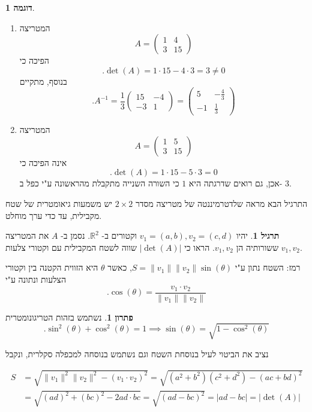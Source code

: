 \documentclass[12pt]{report}
\theoremstyle{plain}
\theoremstyle{definition}
\newtheorem{example}{דוגמה}[chapter]
\newtheorem{exercise}{תרגיל}[chapter]
\newtheorem*{solution}{פתרון}
\newcommand{\R}{\mathbb{R}}
\newcommand{\0}{\mathbf{0}}
\begin{document}
\begin{example}\
\begin{enumerate}[label=\alph*.]
\item 
המטריצה
$$
A=\begin{pmatrix}
1 & 4 \\
3 & 15
\end{pmatrix}
$$
הפיכה כי
$$
.\det(A)=1\cdot15-4\cdot3=3\neq 0
$$
בנוסף, מתקיים
$$
.A^{-1}=\frac{1}{3}\begin{pmatrix}
15 & -4 \\
-3 & 1
\end{pmatrix}=\begin{pmatrix}
5 & -\frac{4}{3} \\
-1 & \frac{1}{3}
\end{pmatrix}
$$

\item 
המטריצה
$$
A=\begin{pmatrix}
1 & 5 \\
3 & 15
\end{pmatrix}
$$
אינה הפיכה כי
$$
.\det(A)=1\cdot15-5\cdot 3=0
$$
אכן, גם רואים שדרגתה היא 
$1$
כי השורה השנייה מתקבלת מהראשונה ע"י כפל ב-
$3$.

\end{enumerate}
\end{example}

התרגיל הבא מראה שלדטרמיננטה של מטריצה מסדר 
$2\times2$
יש משמעות גיאומטרית של שטח מקבילית, עד כדי ערך מוחלט.

\begin{exercise}
יהיו 
$v_1=(a,b),v_2=(c,d)$
וקטורים ב-
$\R^2$.
נסמן ב-
$A$
את המטריצה ששורותיה הן 
$v_1,v_2$.  
הראו כי
$|\det(A)|$
שווה לשטח המקבילית עם וקטורי צלעות
$v_1,v_2$.

רמז: השטח נתון ע"י 
$S=\|v_1\|\|v_2\|\sin(\theta)$,
כאשר 
$\theta$
היא הזווית הקטנה בין וקטורי הצלעות ונתונה ע"י
$$
.\cos(\theta)=\frac{v_1\cdot v_2}{\|v_1\|\|v_2\|}
$$
\end{exercise}

\begin{solution}
נשתמש בזהות הטריגונומטרית
$$
.\sin^2(\theta)+\cos^2(\theta)=1\implies \sin(\theta)=\sqrt{1-\cos^2(\theta)}
$$

נציב את הביטוי לעיל בנוסחת השטח וגם נשתמש בנוסחה למכפלה סקלרית, ונקבל

$$
\begin{aligned}
S&=\sqrt{\|v_1\|^2\|v_2\|^2-(v_1\cdot v_2)^2}=\sqrt{(a^2+b^2)(c^2+d^2)-(ac+bd)^2}\\
&=\sqrt{(ad)^2+(bc)^2-2ad\cdot bc}=\sqrt{(ad-bc)^2}=|ad-bc|=|\det(A)|
\end{aligned}
$$

\end{solution}
\end{document}
